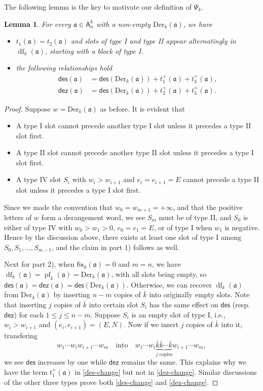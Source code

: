 \documentclass[12pt]{amsart}
\numberwithin{equation}{section}
\theoremstyle{plain}
\newtheorem{lemma}[theorem]{Lemma}
\theoremstyle{definition}
\newcommand\A{\mathsf{A}}
\def\dez{\mathsf{dez}}
\def\Der{\mathrm{Der}}
\def\fix{\mathsf{fix}}
\def\des{\mathsf{des}}
\def\a{\mathfrak{a}}
\def\df{\operatorname{df}}
\def\pf{\operatorname{pf}}
\def\neg#1{{{{\bar#1}}}}
\begin{document}
The following lemma is the key to motivate our definition of $\Psi_k$.
\begin{lemma}\label{block type}
For every $\a\in\A_n^k$ with a non-empty $\Der_k(\a)$, we have
\begin{itemize}
	\item[1)] $t_1(\a)=t_2(\a)$ and slots of type I and type II appear alternatingly in $\df_k(\a)$, starting with a block of type I. 
	\item[2)] the following relationships hold
	\begin{align}
	\label{des-change}\des(\a) &=\des(\Der_k(\a))+t_1^{+}(\a)+t_3^{+}(\a),\\
	\label{dez-change}\dez(\a) &=\des(\Der_k(\a))+t_2^{+}(\a)+t_3^{+}(\a).
	\end{align}
\end{itemize}
\end{lemma}
\begin{proof}
Suppose $w=\Der_k(\a)$ as before. It is evident that 
\begin{itemize}
\item A type I slot cannot precede another type I slot unless it precedes a type II slot first. 
\item A type II slot cannot precede another type II slot unless it precedes a type I slot first.
\item A type IV slot $S_i$ with $w_i>w_{i+1}$ and $e_i=e_{i+1}=E$ cannot precede a type II slot unless it precedes a type I slot first.
\end{itemize}
Since we made the convention that $w_0=w_{m+1}=+\infty$, and that the positive letters of $w$ form a derangement word, we see $S_m$ must be of type II, and $S_0$ is either of type IV with $w_0>w_1>0$, $e_0=e_1=E$, or of type I when $w_1$ is negative. Hence by the discussion above, there exists at least one slot of type I among $S_0,S_1,\ldots,S_{m-1}$, and the claim in part 1) follows as well.

Next for part 2), when $\fix_k(\a)=0$ and $m=n$, we have $\df_k(\a)=\pf_k(\a)=\Der_k(\a)$, with all slots being empty, so $\des(\a)=\dez(\a)=\des(\Der_k(\a))$. Otherwise, we can recover $\df_k(\a)$ from $\Der_k(\a)$ by inserting $n-m$ copies of $\neg k$ into originally empty slots. Note that inserting $j$ copies of $\neg k$ into certain slot $S_i$ has the same effect on $\des$ (resp. $\dez$) for each $1\le j\le n-m$. Suppose $S_i$ is an empty slot of type I, i.e., $w_{i} > w_{i+1}$ and $(e_i,e_{i+1})=(E,N)$. Now if we insert $j$ copies of $\neg k$ into it, transfering
$$w_1\cdots w_i w_{i+1}\cdots w_m \quad \text{into} \quad
	w_1\cdots w_i\underbrace{\bar k \bar k\cdots \bar k}_{\text{$j$ copies}} w_{i+1}\cdots w_m,
$$
we see $\des$ increases by one while $\dez$ remains the same. This explains why we have the term $t_1^+(\a)$ in \eqref{des-change} but not in \eqref{dez-change}. Similar discussions of the other three types prove both \eqref{des-change} and \eqref{dez-change}.
\end{proof}
\end{document}
